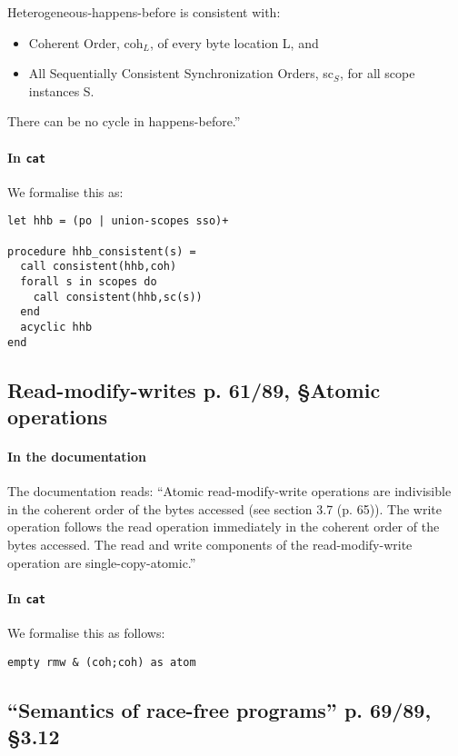 \documentclass[a4paper]{article}
\begin{document}
Heterogeneous-happens-before is consistent with:
\begin{itemize}
\item Coherent Order, coh$_L$, of every byte location L, and
\item All Sequentially Consistent Synchronization Orders, sc$_S$, for all scope
instances S.
\end{itemize}

There can be no cycle in happens-before.'' 

\paragraph{In {\tt cat}}
We formalise this as:
\begin{verbatim}
let hhb = (po | union-scopes sso)+

procedure hhb_consistent(s) =
  call consistent(hhb,coh)
  forall s in scopes do
    call consistent(hhb,sc(s))
  end
  acyclic hhb
end
\end{verbatim}

\subsection{Read-modify-writes p. 61/89, \S Atomic operations}

\paragraph{In the documentation}
The documentation reads:
``Atomic read-modify-write operations are indivisible in the coherent order of
the bytes accessed (see section 3.7  (p. 65)). The write operation follows the
read operation immediately in the coherent order of the bytes accessed. The
read and write components of the read-modify-write operation are
single-copy-atomic.''

\paragraph{In {\tt cat}} We formalise this as follows:
\begin{verbatim}
empty rmw & (coh;coh) as atom
\end{verbatim}


\subsection{``Semantics of race-free programs'' p. 69/89, \S 3.12}
\end{document}
